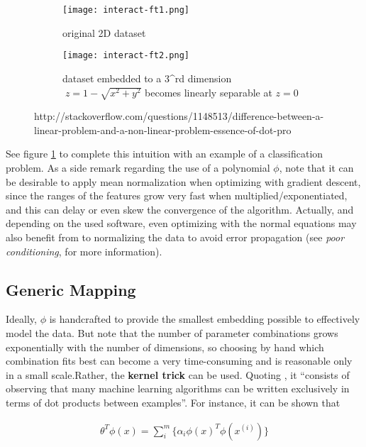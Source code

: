 \begin{figure}
  \centering
  \begin{subfigure}[b]{0.36\textwidth}
    \centering
    \texttt{[image: interact-ft1.png]}
    \caption{original 2D dataset}
  \end{subfigure}
  \hfill
  \begin{subfigure}[b]{0.5\textwidth}
    \centering
    \texttt{[image: interact-ft2.png]}
    \caption{dataset embedded to a 3^{rd} dimension\\\(\;z = 1-\sqrt{x^2 + y^2}\) becomes linearly separable at \(z=0\)}
  \end{subfigure}
  \hfill
  \caption{http://stackoverflow.com/questions/1148513/difference-between-a-linear-problem-and-a-non-linear-problem-essence-of-dot-pro}
  \label{fig:interact}
\end{figure}

See figure \ref{fig:interact} to complete this intuition with an example of a classification problem. As a side remark regarding the use of a polynomial \(\phi\), note that it can be desirable to apply mean normalization when optimizing with gradient descent, since the ranges of the features grow very fast when multiplied/exponentiated, and this can delay or even skew the convergence of the algorithm. Actually, and depending on the used software, even optimizing with the normal equations may also benefit from to normalizing the data to avoid error propagation (see {\it poor conditioning}, \cite[p.82]{goodfellow} for more information).\\


\subsection{Generic Mapping}

Ideally, \(\phi\) is handcrafted to provide the smallest embedding possible to effectively model the data. But note that the number of parameter combinations grows exponentially with the number of dimensions, so choosing by hand which combination fits best can become a very time-consuming and is reasonable only in a small scale.Rather,  the \textbf{kernel trick} can be used. Quoting \cite[p.141]{goodfellow}, it ``consists of observing that many machine learning algorithms can be written exclusively in terms of dot products between examples''. For instance, it can be shown that

\begin{equation*}
  \begin{aligned}
    \theta^T\phi(x) = \sum_i^m \{ \alpha_i \phi(x)^T\phi(x^{(i)})\}
  \end{aligned}
\end{equation*}

